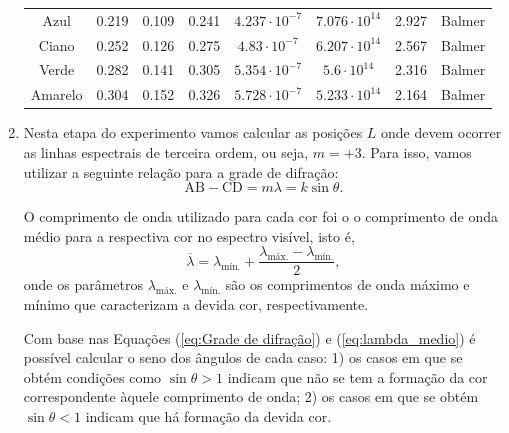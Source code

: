 \documentclass[12pt,a4paper]{article}
\begin{document}
\begin{enumerate}
\begin{table}[htb!]
\begin{tabular}{|c|c|c|c|c|c|c|c|}
            Azul & 0.219 & 0.109 & 0.241 & $4.237\cdot10^{-7}$ & $7.076\cdot10^{14}$ & 2.927 & Balmer \\
            
            Ciano & 0.252 & 0.126 & 0.275 & $4.83\cdot10^{-7}$ & $6.207\cdot10^{14}$ & 2.567 & Balmer \\
            
            Verde & 0.282 & 0.141 & 0.305 & $5.354\cdot10^{-7}$ & $5.6\cdot10^{14}$ & 2.316 & Balmer \\
            
            Amarelo & 0.304 & 0.152 & 0.326 & $5.728\cdot10^{-7}$ & $5.233\cdot10^{14}$ & 2.164 & Balmer \\
            \hline
        \end{tabular}
        \label{tab:Atividade4}
    \end{table}



    \item Nesta etapa do experimento vamos calcular as posições $L$ onde devem ocorrer as linhas espectrais de terceira ordem, ou seja, $m=+3$. Para isso, vamos utilizar a seguinte relação para a grade de difração:
    \begin{equation} \label{eq:Grade de difração}
        \text{AB}-\text{CD}=m\lambda=k\sin{\theta}.
    \end{equation}

    O comprimento de onda utilizado para cada cor foi o o comprimento de onda médio para a respectiva cor no espectro visível, isto é, 
    \begin{equation} \label{eq:lambda_medio}
        \overline{\lambda}=\lambda_{\text{mín.}}+\frac{\lambda_{\text{máx.}}-\lambda_{\text{mín.}}}{2},
    \end{equation}
    onde os parâmetros $\lambda_{\text{máx.}}$ e $\lambda_{\text{mín.}}$ são os comprimentos de onda máximo e mínimo que caracterizam a devida cor, respectivamente.

    Com base nas Equações (\ref{eq:Grade de difração}) e (\ref{eq:lambda_medio}) é possível calcular o seno dos ângulos de cada caso: 1) os casos em que se obtém condições como $\sin{\theta}>1$ indicam que não se tem a formação da cor correspondente àquele comprimento de onda; 2) os casos em que se obtém $\sin{\theta}<1$ indicam que há formação da devida cor.


\end{enumerate}
\end{document}

